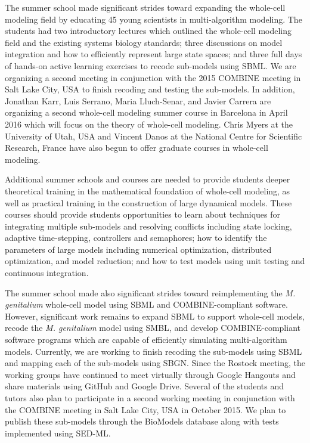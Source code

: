 \documentclass[journal,transmag]{IEEEtran}
\begin{document}
The summer school made significant strides toward expanding the whole-cell modeling field by educating 45 young scientists in multi-algorithm modeling. 
The students had two introductory lectures which outlined the whole-cell modeling field and the existing systems biology standards; three discussions on model integration and how to efficiently represent large state spaces; and three full days of hands-on active learning exercises to recode sub-models using SBML. 
We are organizing a second meeting in conjunction with the 2015 COMBINE meeting in Salt Lake City, USA to finish recoding and testing the sub-models.
In addition, Jonathan Karr, Luis Serrano, Maria Lluch-Senar, and Javier Carrera are organizing a second whole-cell modeling summer course in Barcelona in April 2016 which will focus on the theory of whole-cell modeling. 
Chris Myers at the University of Utah, USA and Vincent Danos at the National Centre for Scientific Research, France have also begun to offer graduate courses in whole-cell modeling.

Additional summer schools and courses are needed to provide students deeper theoretical training in the mathematical foundation of whole-cell modeling, as well as practical training in the construction of large dynamical models. These courses should provide students opportunities to learn about techniques for integrating multiple sub-models and resolving conflicts including state locking, adaptive time-stepping, controllers and semaphores; how to identify the parameters of large models including numerical optimization, distributed optimization, and model reduction; and how to test models using unit testing and continuous integration. 

The summer school made also significant strides toward reimplementing the \textit{M. genitalium} whole-cell model using SBML and COMBINE-compliant software. However, significant work remains to expand SBML to support whole-cell models, recode the \textit{M. genitalium} model using SMBL, and develop COMBINE-compliant software programs which are capable of efficiently simulating multi-algorithm models. Currently, we are working to finish recoding the sub-models using SBML and mapping each of the sub-models using SBGN. Since the Rostock meeting, the working groups have continued to meet virtually through Google Hangouts and share materials using GitHub and Google Drive. Several of the students and tutors also plan to participate in a second working meeting in conjunction with the COMBINE meeting in Salt Lake City, USA in October 2015. We plan to publish these sub-models through the BioModels database along with tests implemented using SED-ML. 
\end{document}
